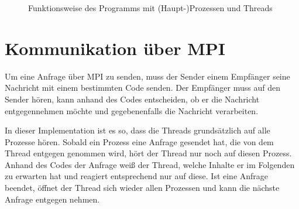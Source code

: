 \documentclass{scrreprt}
\begin{document}
\begin{figure}[!ht]
\centering
{}
\caption{Funktionsweise des Programms mit (Haupt-)Prozessen und Threads}
\label{fig:disthashthreads}
\end{figure}

\section{Kommunikation über MPI}
Um eine Anfrage über MPI zu senden, muss der Sender einem Empfänger seine Nachricht mit einem bestimmten Code senden. Der Empfänger muss auf den Sender hören, kann anhand des Codes entscheiden, ob er die Nachricht entgegennehmen möchte und gegebenenfalls die Nachricht verarbeiten. 

In dieser Implementation ist es so, dass die Threads grundsätzlich auf alle Prozesse hören. Sobald ein Prozess eine Anfrage gesendet hat, die von dem Thread entgegen genommen wird, hört der Thread nur noch auf diesen Prozess. Anhand des Codes der Anfrage weiß der Thread, welche Inhalte er im Folgenden zu erwarten hat und reagiert entsprechend nur auf diese. Ist eine Anfrage beendet, öffnet der Thread sich wieder allen Prozessen und kann die nächste Anfrage entgegen nehmen.
\end{document}
